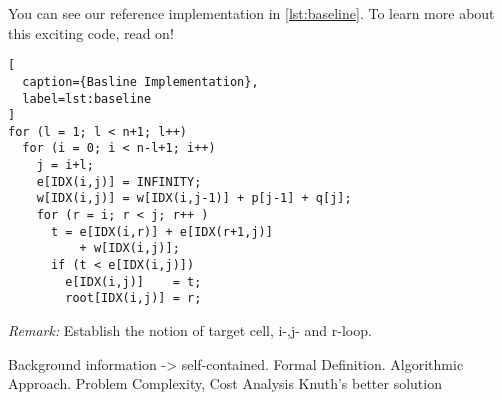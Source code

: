 

You can see our reference implementation in \autoref{lst:baseline}. To
learn more about this exciting code, read on!

\begin{lstlisting}[
  caption={Basline Implementation},
  label=lst:baseline
]
for (l = 1; l < n+1; l++)
  for (i = 0; i < n-l+1; i++)
    j = i+l;
    e[IDX(i,j)] = INFINITY;
    w[IDX(i,j)] = w[IDX(i,j-1)] + p[j-1] + q[j];
    for (r = i; r < j; r++ )
      t = e[IDX(i,r)] + e[IDX(r+1,j)]
          + w[IDX(i,j)];
      if (t < e[IDX(i,j)])
        e[IDX(i,j)]    = t;
        root[IDX(i,j)] = r;
\end{lstlisting}

\emph{Remark:} Establish the notion of target cell, i-,j- and r-loop.

Background information -> self-contained.
Formal Definition.
Algorithmic Approach.
Problem Complexity, Cost Analysis
Knuth's better solution
